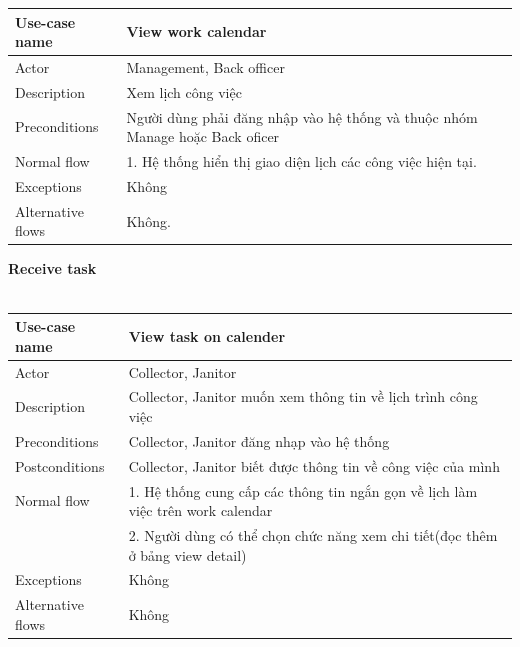 \documentclass[a4paper]{article}
\begin{document}
\begin{enumerate}
\vspace{0.5cm}

\begin{tabular}{|p{3cm}|p{10cm}|}
     \hline
     Use-case name & View work calendar\\
     \hline
     Actor & Management, Back officer\\
     \hline
     Description & Xem lịch công việc\\
     \hline
     Preconditions & Người dùng phải đăng nhập vào hệ thống và thuộc nhóm Manage hoặc Back oficer\\
     \hline
     Normal flow & 1. Hệ thống hiển thị giao diện lịch các công việc hiện tại.\\
     \hline
     Exceptions & Không\\
     \hline
     Alternative flows & Không.\\
     \hline
\end{tabular}

\vspace{0.5cm}

\textbf{Receive task} \\ \\
 \begin{tabular}{| p{3cm} | p{10cm} |}
  \hline
     Use-case name & View task on calender
     \\
     \hline
     Actor & Collector, Janitor
     \\ \hline
     Description & Collector, Janitor muốn xem thông tin về lịch trình công việc 
      \\
     \hline
     Preconditions & Collector, Janitor đăng nhạp vào hệ thống\\
          \hline
     Postconditions & Collector, Janitor biết được thông tin về công việc của mình
     \\ \hline
      Normal flow & 1. Hệ thống cung cấp các thông tin ngắn gọn về lịch làm việc trên work calendar\\
      & 2. Người dùng có thể chọn chức năng xem chi tiết(đọc thêm ở bảng view detail)
     \\ \hline
     Exceptions & Không 
     \\ \hline
     Alternative flows & Không
     \\ \hline
\end{tabular}\\
\vspace{0.5cm}


\end{enumerate}
\end{document}
